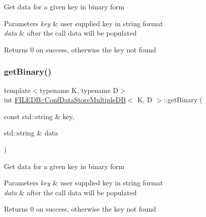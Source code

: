 Get data for a given key in binary form


\begin{DoxyParams}{Parameters}
{\em key} & user supplied key in string format \\
\hline
{\em data} & after the call data will be populated \\
\hline
\end{DoxyParams}
\begin{DoxyReturn}{Returns}
0 on success, otherwise the key not found 
\end{DoxyReturn}
\mbox{\label{classFILEDB_1_1ConfDataStoreMultipleDB_a56fefab208c1b4abc3139afb38035a13}} 
\subsubsection{\texorpdfstring{getBinary()}{getBinary()}\hspace{0.1cm}{\footnotesize\ttfamily [2/2]}}
{\footnotesize\ttfamily template$<$typename K, typename D$>$ \\
int \mbox{\hyperlink{classFILEDB_1_1ConfDataStoreMultipleDB}{F\+I\+L\+E\+D\+B\+::\+Conf\+Data\+Store\+Multiple\+DB}}$<$ K, D $>$\+::get\+Binary (\begin{DoxyParamCaption}\item[{const std\+::string \&}]{key,  }\item[{std\+::string \&}]{data }\end{DoxyParamCaption})\hspace{0.3cm}{\ttfamily [inline]}}

Get data for a given key in binary form


\begin{DoxyParams}{Parameters}
{\em key} & user supplied key in string format \\
\hline
{\em data} & after the call data will be populated \\
\hline
\end{DoxyParams}
\begin{DoxyReturn}{Returns}
0 on success, otherwise the key not found 
\end{DoxyReturn}
\mbox{\label{classFILEDB_1_1ConfDataStoreMultipleDB_adb7a350dc85ad9c3830e98a0f03b68d7}} 
